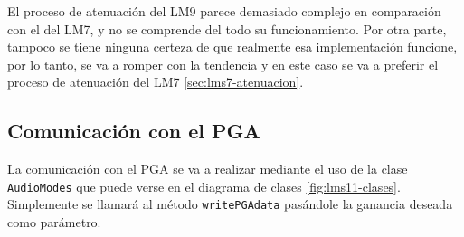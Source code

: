 El proceso de atenuación del \acrshort{LM9} parece demasiado complejo en comparación con el del \acrshort{LM7}, y no se comprende del todo su funcionamiento. Por otra parte, tampoco se tiene ninguna certeza de que realmente esa implementación funcione, por lo tanto, se va a romper con la tendencia y en este caso se va a preferir el proceso de atenuación del \acrshort{LM7} \ref{sec:lms7-atenuacion}.

\subsection{Comunicación con el PGA}

La comunicación con el \acrshort{PGA} se va a realizar mediante el uso de la clase \texttt{AudioModes} que puede verse en el diagrama de clases \ref{fig:lms11-clases}. Simplemente se llamará al método \texttt{writePGAdata} pasándole la ganancia deseada como parámetro.